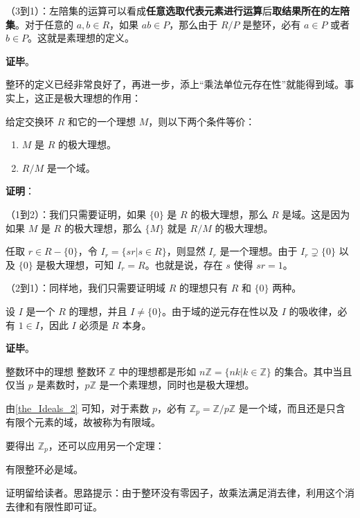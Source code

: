 （3到1）：左陪集的运算可以看成\textbf{任意选取代表元素进行运算}后\textbf{取结果所在的左陪集}。对于任意的 $a, b\in R$，如果 $ab\in P$，那么由于 $R/P$ 是整环，必有 $a\in P$ 或者 $b\in P$。这就是素理想的定义。

\textbf{证毕}。

整环的定义已经非常良好了，再进一步，添上“乘法单位元存在性”就能得到域。事实上，这正是极大理想的作用：

\begin{theorem}{}\label{the_Ideals_2}
给定交换环 $R$ 和它的一个理想 $M$，则以下两个条件等价：
\begin{enumerate}
\item $M$ 是 $R$ 的极大理想。
\item $R/M$ 是一个域。
\end{enumerate}
\end{theorem}

\textbf{证明}：




（1到2）：我们只需要证明，如果 $\{0\}$ 是 $R$ 的极大理想，那么 $R$ 是域。这是因为如果 $M$ 是 $R$ 的极大理想，那么 $\{M\}$ 就是 $R/M$ 的极大理想。

任取 $r\in R-\{0\}$，令 $I_r=\{sr|s\in R\}$，则显然 $I_r$ 是一个理想。由于 $I_r\supsetneq \{0\}$ 以及 $\{0\}$ 是极大理想，可知 $I_r=R$。也就是说，存在 $s$ 使得 $sr=1$。

（2到1）：同样地，我们只需要证明域 $R$ 的理想只有 $R$ 和 $\{0\}$ 两种。

设 $I$ 是一个 $R$ 的理想，并且 $I\not=\{0\}$。由于域的逆元存在性以及 $I$ 的吸收律，必有 $1\in I$，因此 $I$ 必须是 $R$ 本身。


\textbf{证毕}。


\begin{example}{整数环中的理想}
整数环 $\mathbb{Z}$ 中的理想都是形如 $n\mathbb{Z}=\{nk|k\in\mathbb{Z}\}$ 的集合。其中当且仅当 $p$ 是素数时，$p\mathbb{Z}$ 是一个素理想，同时也是极大理想。

由\autoref{the_Ideals_2} 可知，对于素数 $p$，必有 $\mathbb{Z}_p=\mathbb{Z}/p\mathbb{Z}$ 是一个域，而且还是只含有限个元素的域，故被称为有限域。
\end{example}

要得出 $\mathbb{Z}_p$，还可以应用另一个定理：

\begin{theorem}{}
有限整环必是域。
\end{theorem}

证明留给读者。思路提示：由于整环没有零因子，故乘法满足消去律，利用这个消去律和有限性即可证。




